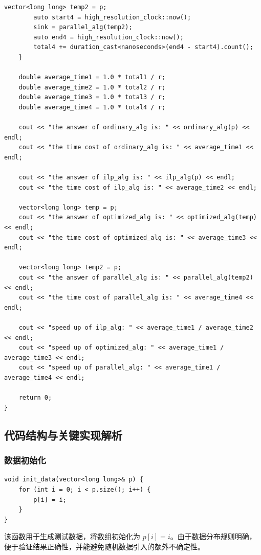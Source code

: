 \documentclass[a4paper,12pt]{ctexart}
\begin{document}
\begin{lstlisting}[title=完整实验代码]
        vector<long long> temp2 = p;
        auto start4 = high_resolution_clock::now();
        sink = parallel_alg(temp2);
        auto end4 = high_resolution_clock::now();
        total4 += duration_cast<nanoseconds>(end4 - start4).count();
    }

    double average_time1 = 1.0 * total1 / r;
    double average_time2 = 1.0 * total2 / r;
    double average_time3 = 1.0 * total3 / r;
    double average_time4 = 1.0 * total4 / r;

    cout << "the answer of ordinary_alg is: " << ordinary_alg(p) << endl;
    cout << "the time cost of ordinary_alg is: " << average_time1 << endl;

    cout << "the answer of ilp_alg is: " << ilp_alg(p) << endl;
    cout << "the time cost of ilp_alg is: " << average_time2 << endl;

    vector<long long> temp = p;
    cout << "the answer of optimized_alg is: " << optimized_alg(temp) << endl;
    cout << "the time cost of optimized_alg is: " << average_time3 << endl;

    vector<long long> temp2 = p;
    cout << "the answer of parallel_alg is: " << parallel_alg(temp2) << endl;
    cout << "the time cost of parallel_alg is: " << average_time4 << endl;

    cout << "speed up of ilp_alg: " << average_time1 / average_time2 << endl;
    cout << "speed up of optimized_alg: " << average_time1 / average_time3 << endl;
    cout << "speed up of parallel_alg: " << average_time1 / average_time4 << endl;

    return 0;
}
\end{lstlisting}

\subsection{代码结构与关键实现解析}

\subsubsection{数据初始化}

\begin{lstlisting}
void init_data(vector<long long>& p) {
    for (int i = 0; i < p.size(); i++) {
        p[i] = i;
    }
}
\end{lstlisting}

该函数用于生成测试数据，将数组初始化为 $p[i]=i$。由于数据分布规则明确，便于验证结果正确性，并能避免随机数据引入的额外不确定性。
\end{document}
